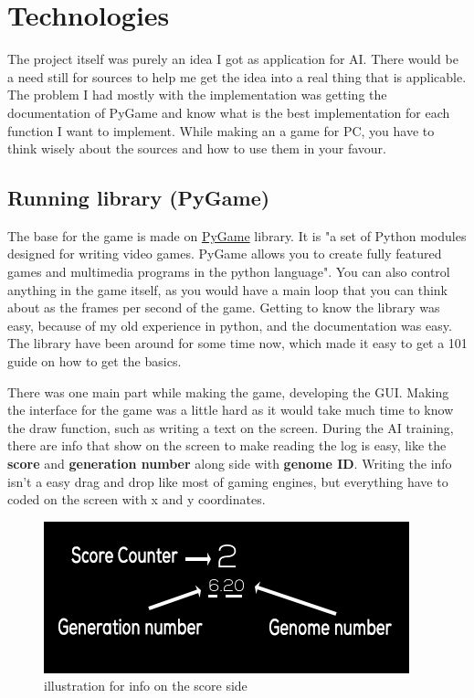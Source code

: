 \chapter{Technologies}

The project itself was purely an idea I got as application for AI. There would be a need still for sources to help me get the idea into a real thing that is applicable. The problem I had mostly with the implementation was getting the documentation of PyGame and know what is the best implementation for each function I want to implement. While making an a game for PC, you have to think wisely about the sources and how to use them in your favour.

\section{ Running library (PyGame)}
The base for the game is made on \href{(https://www.pygame.org/wiki/about}{PyGame} library. It is "a set of Python modules designed for writing video games. PyGame allows you to create fully featured games and multimedia programs in the python language". You can also control anything in the game itself, as you would have a main loop that you can think about as the frames per second of the game. Getting to know the library was easy, because of my old experience in python, and the documentation was easy. The library have been around for some time now, which made it easy to get a 101 guide on how to get the basics.



There was one main part while making the game, developing the GUI. Making the interface for the game was a little hard as it would take much time to know the draw function, such as writing a text on the screen. During the AI training, there are info that show on the screen to make reading the log is easy, like the \textbf{score} and \textbf{generation number} along side with \textbf{genome ID}. Writing the info isn't a easy drag and drop like most of gaming engines, but everything have to coded on the screen with x and y coordinates.
\begin{figure}[H]
	\centering
	\includegraphics[width=0.7\linewidth]{usedImages/scoreFrame}
	\caption{illustration for info on the score side	}
	\label{fig:scoreframe}
\end{figure}


